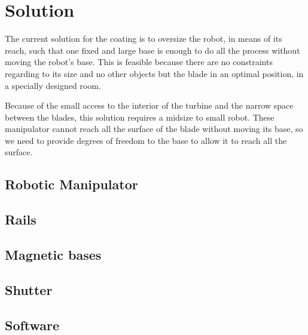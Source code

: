 \section{Solution}


\begin{comment}
A solução de revestimento de uma pá de turbina \textit{in situ} requer um robô
de pequeno a médio porte, capaz de passar pelo limitado acesso da turbina. 
No entanto, a pá da turbina é uma peça com uma grande área a ser coberta e
nenhum manipulador comercial que atenda ao requisitos citados é capaz de
alcançar, de uma só posição, toda a sua extensão.
Assim, é necessário prover ao robô liberdade de posicionamento para realizar o
revestimento em pequenas regiões da pá, por posição de base.

Devido ao peso do manipulador e por questões de segurança, a sua movimentação no
interior da turbina não pode ser uma tarefa manual. Logo, uma base mecânica deve
ser capaz de levar o robô desde a escotilha até a posição ideal para o
revestimento, de forma segura e precisa. O dimensionamento desta base deve levar
em consideração todos os esforços de operação, como: o peso do sistema; as
cargas dinâmicas de movimentação do robô e o empuxo da pistola.

Foram estudados diversos conceitos para os graus de liberdade providos pela
base mecânica. O estudo destes conceitos estão detalhados no EMMA-DETAIL.
\end{comment}

The current solution for the coating is to oversize the robot, in means of its
reach, such that one fixed and large base is enough to do all the process
without moving the robot's base. This is feasible because there are no
constraints regarding to its size and no other objects but the blade
in an optimal position, in a specially designed room.

Because of the small access to the interior of the turbine and the narrow space
between the blades, this solution requires a midsize to small robot. These
manipulator cannot reach all the surface of the blade without moving its base,
so we need to provide degrees of freedom to the base to allow it to reach all
the surface.



\subsection{Robotic Manipulator}

\subsection{Rails}

\subsection{Magnetic bases}

\subsection{Shutter}

\subsection{Software}